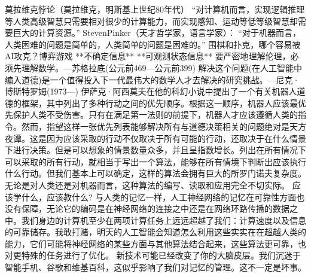 莫拉维克悖论（莫拉维克，明斯基上世纪80年代）
“对计算机而言，实现逻辑推理等人类高级智慧只需要相对很少的计算能力，而实现感知、运动等低等级智慧却需要巨大的计算资源。”
StevenPinker（天才哲学家，语言学家）：
“对于机器而言，人类困难的问题是简单的，人类简单的问题是困难的。”
围棋和扑克，哪个容易被AI攻克？博弈游戏
**不确定信息**
**可观测状态信息**
要严密地理解伦理，必须先理解数学。---苏格拉底(公元前469—公元前399)
解决这个问题(在人工智能中编入道德)是一个值得投入下一代最伟大的数学人才去解决的研究挑战。---尼克·博斯特罗姆(1973—)
伊萨克·阿西莫夫在他的科幻小说中提出了一个有关机器人道德的框架，其中列出了多种行动之间的优先顺序。根据这一顺序，机器人应该最优先保护人类不受伤害。只有在满足第一法则的前提下，机器人才应该遵循人类的指令。然而，指望这样一张优先列表能够解决所有与道德决策相关的问题绝对是天方夜谭。这是因为应该采取的行动不仅取决于所有可能的行动，还取决于在什么情景下进行决策。但是可以想象的情景数量众多，并且呈指数增长。列出在所有情况下可以采取的所有行动，就相当于写出一个算法，能够在所有情境下判断出应该执行什么行动。但我们基本上可以确定，这样的算法会拥有巨大的所罗门诺夫复杂度。无论是对人类还是对机器而言，这种算法的编写、读取和应用完全不切实际。
应该学什么，应该教什么?
与人类的记忆一样，人工神经网络的记忆在可靠性方面也没有保障，无论它的编码是在神经网络的连接之中还是在网络环路传播的数据之中。我们身边的计算机至少在两项计算任务上远远超越了我们：计算速度以及信息的可靠储存。我敢打赌，明天的人工智能会知道怎么利用这些实实在在超越人类的能力，它们可能将神经网络的某些方面与其他算法结合起来，这些算法更可靠，也对更特殊的任务进行了优化。
新技术可能已经改变了你的大脑皮层。我们沉迷于智能手机、谷歌和维基百科，这似乎影响了我们对记忆的管理。这不一定是坏事。
